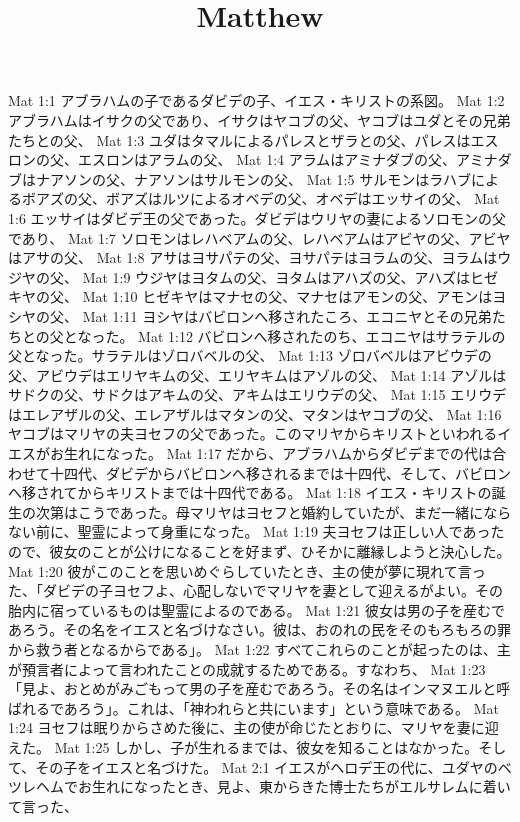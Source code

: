 

\title{Matthew}

Mat 1:1  アブラハムの子であるダビデの子、イエス・キリストの系図。
Mat 1:2  アブラハムはイサクの父であり、イサクはヤコブの父、ヤコブはユダとその兄弟たちとの父、
Mat 1:3  ユダはタマルによるパレスとザラとの父、パレスはエスロンの父、エスロンはアラムの父、
Mat 1:4  アラムはアミナダブの父、アミナダブはナアソンの父、ナアソンはサルモンの父、
Mat 1:5  サルモンはラハブによるボアズの父、ボアズはルツによるオベデの父、オベデはエッサイの父、
Mat 1:6  エッサイはダビデ王の父であった。ダビデはウリヤの妻によるソロモンの父であり、
Mat 1:7  ソロモンはレハベアムの父、レハベアムはアビヤの父、アビヤはアサの父、
Mat 1:8  アサはヨサパテの父、ヨサパテはヨラムの父、ヨラムはウジヤの父、
Mat 1:9  ウジヤはヨタムの父、ヨタムはアハズの父、アハズはヒゼキヤの父、
Mat 1:10  ヒゼキヤはマナセの父、マナセはアモンの父、アモンはヨシヤの父、
Mat 1:11  ヨシヤはバビロンへ移されたころ、エコニヤとその兄弟たちとの父となった。
Mat 1:12  バビロンへ移されたのち、エコニヤはサラテルの父となった。サラテルはゾロバベルの父、
Mat 1:13  ゾロバベルはアビウデの父、アビウデはエリヤキムの父、エリヤキムはアゾルの父、
Mat 1:14  アゾルはサドクの父、サドクはアキムの父、アキムはエリウデの父、
Mat 1:15  エリウデはエレアザルの父、エレアザルはマタンの父、マタンはヤコブの父、
Mat 1:16  ヤコブはマリヤの夫ヨセフの父であった。このマリヤからキリストといわれるイエスがお生れになった。
Mat 1:17  だから、アブラハムからダビデまでの代は合わせて十四代、ダビデからバビロンへ移されるまでは十四代、そして、バビロンへ移されてからキリストまでは十四代である。
Mat 1:18  イエス・キリストの誕生の次第はこうであった。母マリヤはヨセフと婚約していたが、まだ一緒にならない前に、聖霊によって身重になった。
Mat 1:19  夫ヨセフは正しい人であったので、彼女のことが公けになることを好まず、ひそかに離縁しようと決心した。
Mat 1:20  彼がこのことを思いめぐらしていたとき、主の使が夢に現れて言った、「ダビデの子ヨセフよ、心配しないでマリヤを妻として迎えるがよい。その胎内に宿っているものは聖霊によるのである。
Mat 1:21  彼女は男の子を産むであろう。その名をイエスと名づけなさい。彼は、おのれの民をそのもろもろの罪から救う者となるからである」。
Mat 1:22  すべてこれらのことが起ったのは、主が預言者によって言われたことの成就するためである。すなわち、
Mat 1:23  「見よ、おとめがみごもって男の子を産むであろう。その名はインマヌエルと呼ばれるであろう」。これは、「神われらと共にいます」という意味である。
Mat 1:24  ヨセフは眠りからさめた後に、主の使が命じたとおりに、マリヤを妻に迎えた。
Mat 1:25  しかし、子が生れるまでは、彼女を知ることはなかった。そして、その子をイエスと名づけた。
Mat 2:1  イエスがヘロデ王の代に、ユダヤのベツレヘムでお生れになったとき、見よ、東からきた博士たちがエルサレムに着いて言った、
